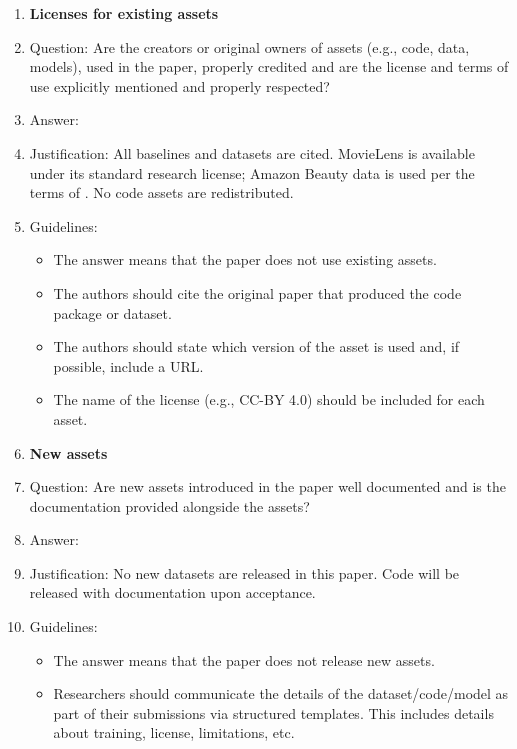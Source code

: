 \begin{enumerate}
\item {\bf Licenses for existing assets}
    \item[] Question: Are the creators or original owners of assets (e.g., code, data, models), used in the paper, properly credited and are the license and terms of use explicitly mentioned and properly respected?
    \item[] Answer: \answerYes{}
    \item[] Justification: All baselines and datasets are cited. MovieLens is available under its standard research license; Amazon Beauty data is used per the terms of \citet{ni2019justifying}. No code assets are redistributed.
    \item[] Guidelines:
    \begin{itemize}
        \item The answer \answerNA{} means that the paper does not use existing assets.
        \item The authors should cite the original paper that produced the code package or dataset.
        \item The authors should state which version of the asset is used and, if possible, include a URL.
        \item The name of the license (e.g., CC-BY 4.0) should be included for each asset.
    \end{itemize}

\item {\bf New assets}
    \item[] Question: Are new assets introduced in the paper well documented and is the documentation provided alongside the assets?
    \item[] Answer: \answerNA{}
    \item[] Justification: No new datasets are released in this paper. Code will be released with documentation upon acceptance.
    \item[] Guidelines:
    \begin{itemize}
        \item The answer \answerNA{} means that the paper does not release new assets.
        \item Researchers should communicate the details of the dataset/code/model as part of their submissions via structured templates. This includes details about training, license, limitations, etc.
    \end{itemize}


\end{enumerate}
